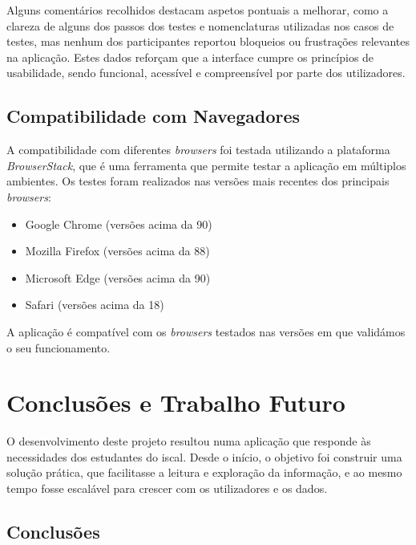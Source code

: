 Alguns comentários recolhidos destacam aspetos pontuais a melhorar, como a clareza de alguns dos passos dos testes e nomenclaturas utilizadas nos casos de testes, mas nenhum dos participantes reportou bloqueios ou frustrações relevantes na aplicação. Estes dados reforçam que a interface cumpre os princípios de usabilidade, sendo funcional, acessível e compreensível por parte dos utilizadores.

\section{Compatibilidade com Navegadores}

A compatibilidade com diferentes \textit{browsers} foi testada utilizando a plataforma \textit{BrowserStack}, que é uma ferramenta que permite testar a aplicação em múltiplos ambientes. Os testes foram realizados nas versões mais recentes dos principais \textit{browsers}:

\begin{itemize}
    \item Google Chrome (versões acima da 90)
    \item Mozilla Firefox (versões acima da 88)
    \item Microsoft Edge (versões acima da 90)
    \item Safari (versões acima da 18)
\end{itemize}

A aplicação é compatível com os \textit{browsers} testados nas versões em que validámos o seu funcionamento.

\chapter{Conclusões e Trabalho Futuro}
\label{ch:conclusoesTrabalhoFuturo}

O desenvolvimento deste projeto resultou numa aplicação que responde às necessidades dos estudantes do \gls{iscal}. Desde o início, o objetivo foi construir uma solução prática, que facilitasse a leitura e exploração da informação, e ao mesmo tempo fosse escalável para crescer com os utilizadores e os dados.

\section{Conclusões}


